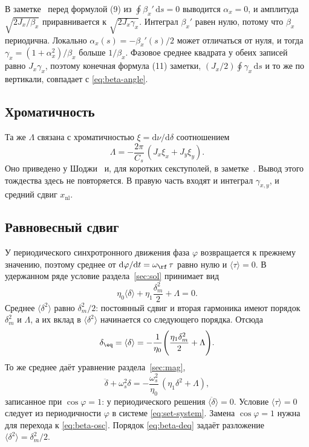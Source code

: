 В заметке~\cite{SenichevNote} перед формулой (9) из $\oint\beta_x'\,\mathrm{d}s=0$ выводится $\alpha_x=0$, и амплитуда $\sqrt{2J_x/\beta_x}$ приравнивается к $\sqrt{2J_x\gamma_x}$. Интеграл $\beta_x'$ равен нулю, потому что $\beta_x$ периодична. Локально $\alpha_x(s)=-\beta_x'(s)/2$ может отличаться от нуля, и тогда $\gamma_x=(1+\alpha_x^2)/\beta_x$ больше $1/\beta_x$. Фазовое среднее квадрата у обеих записей равно $J_x\gamma_x$, поэтому конечная формула (11) заметки, $(J_x/2)\oint\gamma_x\,\mathrm{d}s$ и то же по вертикали, совпадает с \eqref{eq:beta-angle}.

\subsection{Хроматичность}
\label{sec:beta-xi}

Та же $\Lambda$ связана с хроматичностью $\xi=\mathrm{d}\nu/\mathrm{d}\delta$ соотношением
\begin{equation}
\label{eq:beta-xi}
\Lambda=-\frac{2\pi}{C_s}\,(J_x\xi_x+J_y\xi_y).
\end{equation}
Оно приведено у Шоджи~\cite{Shoji2005} и, для коротких секступолей, в заметке~\cite{SenichevNote}. Вывод этого тождества здесь не повторяется. В правую часть входят и интеграл $\gamma_{x,y}$, и средний сдвиг $x_{\mathrm{nl}}$.

\subsection{Равновесный сдвиг}
\label{sec:beta-eq}

У периодического синхротронного движения фаза $\varphi$ возвращается к прежнему значению, поэтому среднее от $\mathrm{d}\varphi/\mathrm{d}t=\omega_\rf\,\tau$ равно нулю и $\langle\tau\rangle=0$. В удержанном ряде условие раздела~\ref{sec:sol} принимает вид
\begin{equation}
\label{eq:beta-sync}
\eta_0\langle\delta\rangle+\eta_1\frac{\delta_m^2}{2}+\Lambda=0.
\end{equation}
Среднее $\langle\delta^2\rangle$ равно $\delta_m^2/2$: постоянный сдвиг и вторая гармоника имеют порядок $\delta_m^2$ и $\Lambda$, а их вклад в $\langle\delta^2\rangle$ начинается со следующего порядка. Отсюда
\begin{equation}
\label{eq:beta-deq}
\delta_\eq
=\langle\delta\rangle
=-\frac{1}{\eta_0}\Biggl(\frac{\eta_1\delta_m^2}{2}+\Lambda\Biggr).
\end{equation}
То же среднее даёт уравнение раздела~\ref{sec:mag},
\begin{equation}
\label{eq:beta-osc}
\ddot\delta+\omega_s^2\delta
=-\frac{\omega_s^2}{\eta_0}\,(\eta_1\delta^2+\Lambda),
\end{equation}
записанное при $\cos\varphi=1$: у периодического решения $\langle\ddot\delta\rangle=0$. Условие $\langle\tau\rangle=0$ следует из периодичности $\varphi$ в системе \eqref{eq:set-system}. Замена $\cos\varphi=1$ нужна для перехода к \eqref{eq:beta-osc}. Порядок \eqref{eq:beta-deq} задаёт разложение $\langle\delta^2\rangle=\delta_m^2/2$.

